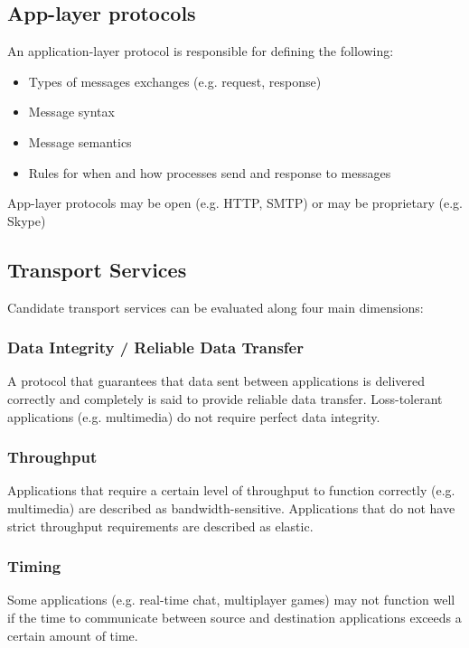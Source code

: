 \documentclass[12pt,titlepage]{article}
\begin{document}
    \subsection{App-layer protocols}
      An application-layer protocol is responsible for defining the following:
      \begin{itemize}
        \item Types of messages exchanges (e.g. request, response)
        \item Message syntax
        \item Message semantics
        \item Rules for when and how processes send and response to messages
      \end{itemize}
      App-layer protocols may be open (e.g. HTTP, SMTP) or may be proprietary (e.g. Skype)

    \subsection{Transport Services}
      Candidate transport services can be evaluated along four main dimensions:

      \subsubsection{Data Integrity / Reliable Data Transfer}
        A protocol that guarantees that data sent between applications is delivered correctly and completely is said to provide reliable data transfer. Loss-tolerant applications
        (e.g. multimedia) do not require perfect data integrity.

      \subsubsection{Throughput}
        Applications that require a certain level of throughput to function correctly (e.g. multimedia) are described as bandwidth-sensitive. Applications that do not have strict
        throughput requirements are described as elastic.

      \subsubsection{Timing}
        Some applications (e.g. real-time chat, multiplayer games) may not function well if the time to communicate between source and destination applications exceeds a certain
        amount of time.
\end{document}
